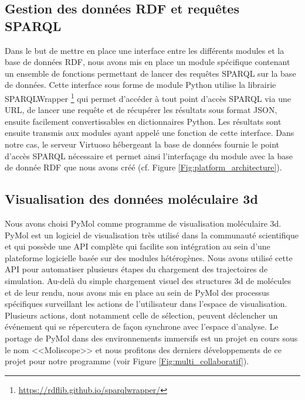 \subsection{Gestion des données RDF et requêtes SPARQL}

Dans le but de mettre en place une interface entre les différents modules et la base de données RDF, nous avons mis en place un module spécifique contenant un ensemble de fonctions permettant de lancer des requêtes SPARQL sur la base de données. 
Cette interface sous forme de module Python utilise la librairie SPARQLWrapper \footnote{\url{https://rdflib.github.io/sparqlwrapper/}} qui permet d'accéder à tout point d'accès SPARQL via une URL, de lancer une requête et de récupérer les résultats sous format JSON, ensuite facilement convertissables en dictionnaires Python. Les résultats sont ensuite transmis aux modules ayant appelé une fonction de cette interface. Dans notre cas, le serveur Virtuoso hébergeant la base de données fournie le point d'accès SPARQL nécessaire et permet ainsi l'interfaçage du module avec la base de donnée RDF que nous avons créé (cf. Figure \ref{Fig:platform_architecture}).

\subsection{Visualisation des données moléculaire 3d}

Nous avons choisi PyMol \cite{delano_pymol_2002} comme programme de visualisation moléculaire 3d. PyMol est un logiciel de visualisation très utilisé dans la communauté scientifique et qui possède une API complète qui facilite son intégration au sein d'une plateforme logicielle basée sur des modules hétérogènes. 
Nous avons utilisé cette API pour automatiser plusieurs étapes du chargement des trajectoires de simulation. Au-delà du simple chargement visuel des structures 3d de molécules et de leur rendu, nous avons mis en place au sein de PyMol des processus spécifiques surveillant les actions de l'utilisateur dans l'espace de visualisation. 
Plusieurs actions, dont notamment celle de sélection, peuvent déclencher un événement qui se répercutera de façon synchrone avec l'espace d'analyse. Le portage de PyMol dans des environnements immersifs est un projet en cours sous le nom <<Moliscope>> et nous profitons des derniers développements de ce projet pour notre programme (voir Figure \ref{Fig:multi_collaboratif}).

